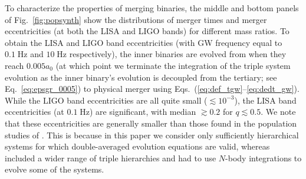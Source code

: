 \documentclass[
        fleqn,
        usenatbib,
    ]{mnras}
\begin{document}
To characterize the properties of merging binaries, the middle and bottom panels
of Fig.~\ref{fig:popsynth} show the distributions of merger times and merger
eccentricities (at both the LISA and LIGO bands) for different mass ratios. To
obtain the LISA and LIGO band eccentricities (with GW frequency equal to
$0.1\;\mathrm{Hz}$ and $10\;\mathrm{Hz}$ respectively), the inner binaries are
evolved from when they reach $0.005 a_0$ (at which point we terminate the
integration of the triple system evolution as the inner binary's
evolution is decoupled from the tertiary; see Eq.~\ref{eq:epsgr_0005}) to
physical merger using Eqs.~(\ref{eq:def_tgw}--\ref{eq:dedt_gw}). While the LIGO
band eccentricities are all quite small ($\lesssim 10^{-3}$), the LISA band
eccentricities (at $0.1 \;\mathrm{Hz}$) are significant, with median $\gtrsim
0.2$ for $q\lesssim 0.5$. We note that these eccentricities are generally
smaller than those found in the population studies of \citet{LL19}. This is
because in this paper we consider only sufficiently hierarchical systems for
which double-averaged evolution equations are valid, whereas \citet{LL19}
included a wider range of triple hierarchies and had to use $N$-body
integrations to evolve some of the systems.
\end{document}
